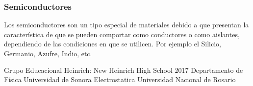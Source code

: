 \documentclass[14pt]{article}
\begin{document}
	\subsubsection{Semiconductores}
	Los semiconductores son un tipo especial de materiales debido a que
	presentan la característica de que se pueden comportar como conductores
	o como aislantes, dependiendo de las condiciones en que se utilicen. Por ejemplo el Silicio, Germanio, Azufre, Indio, etc. 
	\newpage
	\begin{thebibliography}{0}
		Grupo Educacional Heinrich:
		New Heinrich High School
		2017 Departamento de Física
		Universidad de Sonora
		Electrostatica Universidad Nacional de Rosario 
	\end{thebibliography}
\end{document}
